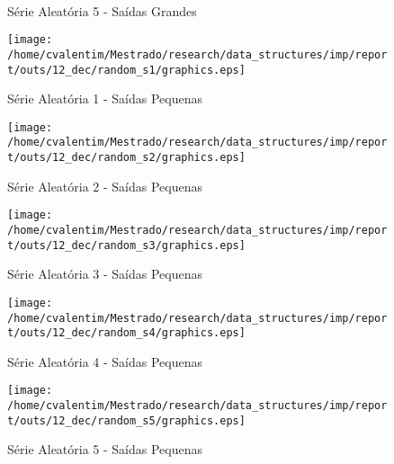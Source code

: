 \documentclass[12pt]{article}
\begin{document}
\begin{figure}
\begin{center}
\\
\caption{Série Aleatória 5 - Saídas Grandes}
\label{5-large-random}
\end{center}
\end{figure}

\clearpage

\begin{figure}
\begin{center}
\texttt{[image: /home/cvalentim/Mestrado/research/data\_structures/imp/report/outs/12\_dec/random\_s1/graphics.eps]}
\caption{Série Aleatória 1 - Saídas Pequenas}
\end{center}
\end{figure}

\begin{figure}
\begin{center}
\texttt{[image: /home/cvalentim/Mestrado/research/data\_structures/imp/report/outs/12\_dec/random\_s2/graphics.eps]}
\caption{Série Aleatória 2 - Saídas Pequenas}
\end{center}
\end{figure}

\begin{figure}
\begin{center}
\texttt{[image: /home/cvalentim/Mestrado/research/data\_structures/imp/report/outs/12\_dec/random\_s3/graphics.eps]}
\caption{Série Aleatória 3 - Saídas Pequenas}
\end{center}
\end{figure}

\begin{figure}
\begin{center}
\texttt{[image: /home/cvalentim/Mestrado/research/data\_structures/imp/report/outs/12\_dec/random\_s4/graphics.eps]}
\caption{Série Aleatória 4 - Saídas Pequenas}
\end{center}
\end{figure}

\begin{figure}
\begin{center}
\texttt{[image: /home/cvalentim/Mestrado/research/data\_structures/imp/report/outs/12\_dec/random\_s5/graphics.eps]}
\caption{Série Aleatória 5 - Saídas Pequenas}
\end{center}
\end{figure}




%
\end{document}
